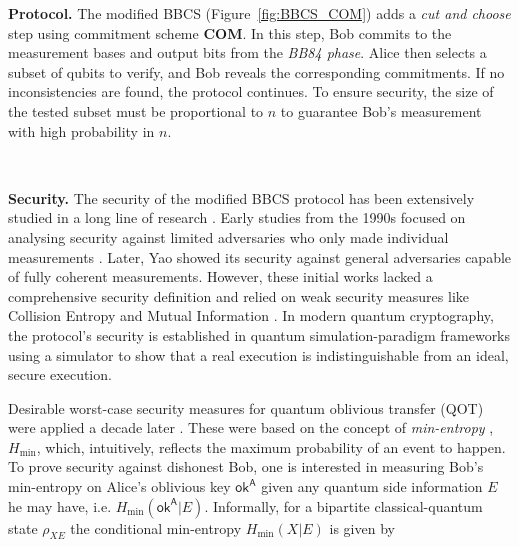 \noindent\textbf{Protocol.} The modified BBCS (Figure~\ref{fig:BBCS_COM}) adds a \textit{cut and choose} step using commitment scheme \textbf{COM}. In this step, Bob commits to the measurement bases and output bits from the \textit{BB84 phase}. Alice then selects a subset of qubits to verify, and Bob reveals the corresponding commitments. If no inconsistencies are found, the protocol continues. To ensure security, the size of the tested subset must be proportional to $n$ to guarantee Bob's measurement with high probability in $n$.

\

\noindent\textbf{Security.} The security of the modified BBCS protocol has been extensively studied in a long line of research \cite{CK88, BBCS92, MS94, Y95, M96b, CDMS04, FS09, DFLSS09, U10, BF10, GLSV21, BCKM21}. Early studies from the 1990s focused on analysing security against limited adversaries who only made individual measurements \cite{MS94}. Later, Yao \cite{Y95} showed its security against general adversaries capable of fully coherent measurements. However, these initial works \cite{MS94, Y95, M96b} lacked a comprehensive security definition and relied on weak security measures like Collision Entropy and Mutual Information \cite{BCC+10, TR11}. In modern quantum cryptography, the protocol's security is established in quantum simulation-paradigm frameworks \cite{FS09, U10, DFLSS09, KWW12} using a simulator to show that a real execution is indistinguishable from an ideal, secure execution.


Desirable worst-case security measures for quantum oblivious transfer (QOT) were applied a decade later \cite{R06, DFRSS07}. These were based on the concept of \textit{min-entropy} \cite{BCC+10,TR11}, $H_{\text{min}}$, which, intuitively, reflects the maximum probability of an event to happen. To prove security against dishonest Bob, one is interested in measuring Bob's min-entropy on Alice's oblivious key $\mathsf{ok}^{\mathsf{A}}$ given any quantum side information $E$ he may have, i.e. $H_{\text{min}}(\mathsf{ok}^{\mathsf{A}} | E)$. Informally, for a bipartite classical-quantum state $\rho_{X E}$ the conditional min-entropy $H_{\text{min}}(X | E)$ is given by 


